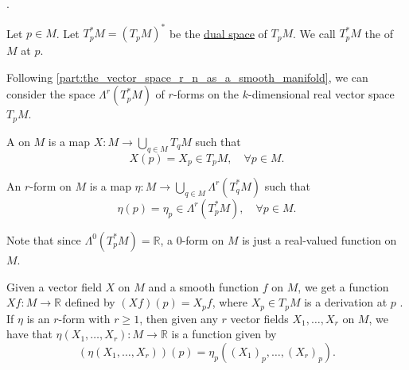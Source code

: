 \documentclass[notoc,notitlepage]{tufte-book}
\begin{document}
.

\begin{defn}\label{defn:cotangent_space_on_a_submanifold}
  Let $p \in M$. Let $T^*_p M = (T_p M)^*$ be the
  \hyperref[defn:dual_space]{dual space} of $T_p M$. We call $T^*_p M$ the
   of $M$ at $p$.
\end{defn}

Following \cref{part:the_vector_space_r_n_as_a_smooth_manifold}, we can consider
the space $\Lambda^r(T^*_p M)$ of $r$-forms on the $k$-dimensional real vector
space $T_p M$.

\begin{defn}\label{defn:vector_fields_on_submanifold}
  A  on $M$ is a map $X : M \to \bigcup_{q \in M} T_q M$ 
  such that
  \begin{equation*}
    X(p) = X_p \in T_p M, \quad \forall p \in M.
  \end{equation*}
\end{defn}

\begin{defn}\label{defn:forms_on_submanifolds}
  An $r$-form on $M$ is a map $\eta : M \to \bigcup_{q \in M} \Lambda^r(T_q^*
  M)$ such that
  \begin{equation*}
    \eta(p) = \eta_p \in \Lambda^r(T_p^* M), \quad \forall p \in M.
  \end{equation*}
\end{defn}

\begin{note}
  Note that since $\Lambda^0(T_p^* M) = \mathbb{R}$, a $0$-form on $M$ is just a
  real-valued function on $M$.
\end{note}

\begin{remark}
  Given a vector field $X$ on $M$ and a smooth function $f$ on $M$, we get a
  function $X f : M \to \mathbb{R}$ defined by $(Xf)(p) = X_p f$, where $X_p \in
  T_p M$ is a derivation at $p$ . If $\eta$
  is an $r$-form with $r \geq 1$, then given any $r$ vector fields $X_1, \ldots,
  X_r$ on $M$, we have that $\eta(X_1, \ldots, X_r) : M \to \mathbb{R}$ is a
  function given by
  \begin{equation*}
    (\eta(X_1, \ldots, X_r))(p) = \eta_p((X_1)_p, \ldots, (X_r)_p).
  \end{equation*}
\end{remark}
\end{document}
